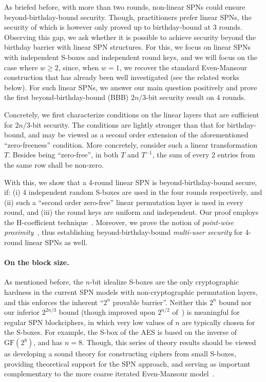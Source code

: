 As briefed before, with more than two rounds, non-linear SPNs could ensure beyond-birthday-bound security. Though, practitioners prefer linear SPNs, the security of which is however only proved up to birthday-bound at 3 rounds.
%
%
%
Observing this gap, we ask whether it is possible to achieve security beyond the birthday barrier with linear SPN structures. For this, we focus on linear SPNs with independent S-boxes and independent round keys, and we will focus on the case where $w\geq2$, since, when $w = 1$, we recover the standard Even-Mansour construction that has already been well investigated (see the related works below). For such linear SPNs, we answer our main question positively and prove the first beyond-birthday-bound (BBB) $2n/3$-bit security result on 4 rounds.


Concretely, we first characterize conditions on the linear layers that are sufficient for $2n/3$-bit security. The conditions are lightly stronger than that for birthday-bound, and may be viewed as a second order extension of the aforementioned ``zero-freeness'' condition. More concretely, consider such a linear transformation $T$. Besides being ``zero-free'', in both $T$ and $T^{-1}$, the sum of every 2 entries from the same row shall be non-zero.
%
%

With this, we show that a 4-round linear SPN is beyond-birthday-bound secure, if: (i) 4 independent random S-boxes are used in the four rounds respectively, and (ii) such a ``second order zero-free'' linear permutation layer is used in every round, and (iii) the round keys are uniform and independent. Our proof employs the H-coefficient technique~\cite{SAC:Patarin08}. Moreover, we prove the notion of {\it point-wise proximity}~\cite{C:HoaTes16}, thus establishing beyond-birthday-bound {\it multi-user security} for 4-round linear SPNs as well.





\paragraph{On the block size.}

As mentioned before, the $n$-bit idealize S-boxes are the only cryptographic hardness in the current SPN models with non-cryptographic permutation layers, and this enforces the inherent ``$2^n$ provable barrier''. Neither this $2^n$ bound nor our inferior $2^{2n/3}$ bound (though improved upon $2^{n/2}$ of~\cite{C:CDKLST18}) is meaningful for regular SPN blockciphers, in which very low values of $n$ are typically chosen for the S-boxes. For example, the S-box of the AES is based on the inverse of $\text{GF}(2^8)$, and has $n=8$. Though, this series of theory results should be viewed as developing a sound theory for constructing ciphers from small S-boxes, providing theoretical support for the SPN approach, and serving as important complementary to the more coarse iterated Even-Mansour model~\cite{EC:BKLSST12}.

